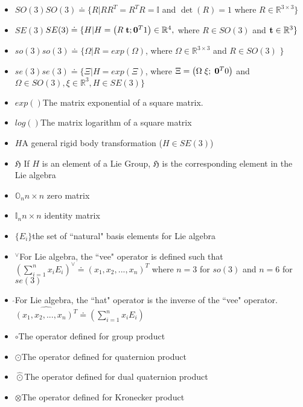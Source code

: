 \documentclass{llncs}
\newcommand{\ttt}{{\bf t}}
\renewcommand{\section}[1]{\vspace{0.1in}\noindent{\large\bf{#1}}\par\vspace{.05in}\par\nopagebreak}
\begin{document}
\section{nomenclature}
\begin{itemize}

\item{$SO(3)$}{$SO(3) \doteq \{R|RR^{T} = R^{T}R = \mathbb{I}$ and $\det(R) = 1$ where $R \in \mathbb{R}^{3 \times 3}\}$}
\item{$SE(3)$}{$SE(3) \doteq \{H|H=\left( R \;   \ttt ; {\bf 0}^{T} 1 \right) \in \mathbb{R}^{4 \time 4},$ where $R \in SO(3)$ and $\ttt \in \mathbb{R}^{3}\}$ }
\item{$so(3)$}{$so(3) \doteq \{\Omega |R = exp(\Omega)$, where $\Omega \in \mathbb{R}^{3 \times 3}$ and $R \in SO(3)$ $\}$}
\item{$se(3)$}{$se(3) \doteq \{\Xi |H = exp(\Xi)$, where $\Xi =\left(\Omega \; \xi; \; {\bf 0}^{T} 0 \right)$ and $\Omega \in SO(3), \xi \in \mathbb{R}^{3}, H \in SE(3) \}$}
\item{$exp()$}{The matrix exponential of a square matrix. }
\item{$log()$}{The matrix logarithm of a square matrix}
\item{$H$}{A general rigid body transformation ($H \in SE(3)$) }
\item{$\mathfrak{H}$}{ If $H$ is an element of a Lie Group, $\mathfrak{H}$ is the corresponding element in the Lie algebra}
\item{$\mathbb{O}_n$}{$n \times n$ zero matrix}
\item{$\mathbb{I}_n$}{$n \times n$ identity matrix}
\item{$\{E_i\}$}{the set of ``natural" basis elements for Lie algebra}
\item{$^\vee$}{For Lie algebra, the ``vee" operator is defined such that $\left(\displaystyle\sum\limits_{i=1}^n x_iE_i\right)^{\vee}\doteq(x_1,x_2,...,x_n)^T$ where $n = 3$ for $so(3)$ and $n = 6$ for $se(3)$}
\item{$\hat{}$}{For Lie algebra, the ``hat" operator is the inverse of the ``vee" operator. $\widehat{(x_1,x_2,...,x_n)^T} \doteq \left( \displaystyle\sum\limits_{i=1}^n x_iE_i \right)$}
\item{$\circ$}{The operator defined for group product}
\item{$\odot$}{The operator defined for quaternion product}
\item{$\hat{\odot}$}{The operator defined for dual quaternion product}
\item{$\otimes$}{The operator defined for Kronecker product}

\end{itemize}
\end{document}
